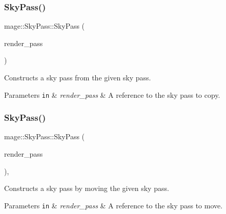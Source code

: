 \subsubsection{\texorpdfstring{Sky\+Pass()}{SkyPass()}\hspace{0.1cm}{\footnotesize\ttfamily [2/3]}}
{\footnotesize\ttfamily mage\+::\+Sky\+Pass\+::\+Sky\+Pass (\begin{DoxyParamCaption}\item[{const \hyperlink{classmage_1_1_sky_pass}{Sky\+Pass} \&}]{render\+\_\+pass }\end{DoxyParamCaption})\hspace{0.3cm}{\ttfamily [delete]}}

Constructs a sky pass from the given sky pass.


\begin{DoxyParams}[1]{Parameters}
\mbox{\tt in}  & {\em render\+\_\+pass} & A reference to the sky pass to copy. \\
\hline
\end{DoxyParams}
\hypertarget{classmage_1_1_sky_pass_a86acd9fdb50c3c92a6c15632362aea47}{}\label{classmage_1_1_sky_pass_a86acd9fdb50c3c92a6c15632362aea47} 
\subsubsection{\texorpdfstring{Sky\+Pass()}{SkyPass()}\hspace{0.1cm}{\footnotesize\ttfamily [3/3]}}
{\footnotesize\ttfamily mage\+::\+Sky\+Pass\+::\+Sky\+Pass (\begin{DoxyParamCaption}\item[{\hyperlink{classmage_1_1_sky_pass}{Sky\+Pass} \&\&}]{render\+\_\+pass }\end{DoxyParamCaption})\hspace{0.3cm}{\ttfamily [default]}, {\ttfamily [noexcept]}}

Constructs a sky pass by moving the given sky pass.


\begin{DoxyParams}[1]{Parameters}
\mbox{\tt in}  & {\em render\+\_\+pass} & A reference to the sky pass to move. \\
\hline
\end{DoxyParams}
\hypertarget{classmage_1_1_sky_pass_ab3e581e2eedfc62e13c71d91359f71ce}{}\label{classmage_1_1_sky_pass_ab3e581e2eedfc62e13c71d91359f71ce} 
